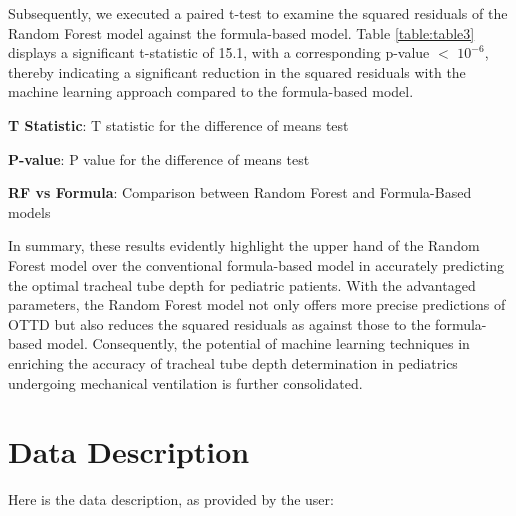 \documentclass[11pt]{article}
\begin{document}
Subsequently, we executed a paired t-test to examine the squared residuals of the Random Forest model against the formula-based model. Table \ref{table:table3} displays a significant t-statistic of 15.1, with a corresponding p-value $<$ $10^{-6}$, thereby indicating a significant reduction in the squared residuals with the machine learning approach compared to the formula-based model.

\begin{table}[h]
\caption{Paired T-test between the Squared Residuals of the Machine-Learning Model and the Formula-Based Model}
\label{table:table3}
\begin{threeparttable}
\renewcommand{\TPTminimum}{\linewidth}
\begin{tablenotes}
\footnotesize
\item \textbf{T Statistic}: T statistic for the difference of means test
\item \textbf{P-value}: P value for the difference of means test
\item \textbf{RF vs Formula}: Comparison between Random Forest and Formula-Based models
\end{tablenotes}
\end{threeparttable}
\end{table}


In summary, these results evidently highlight the upper hand of the Random Forest model over the conventional formula-based model in accurately predicting the optimal tracheal tube depth for pediatric patients. With the advantaged parameters, the Random Forest model not only offers more precise predictions of OTTD but also reduces the squared residuals as against those to the formula-based model. Consequently, the potential of machine learning techniques in enriching the accuracy of tracheal tube depth determination in pediatrics undergoing mechanical ventilation is further consolidated.


\clearpage
\appendix

\section{Data Description} \label{sec:data_description} Here is the data description, as provided by the user:
\end{document}
